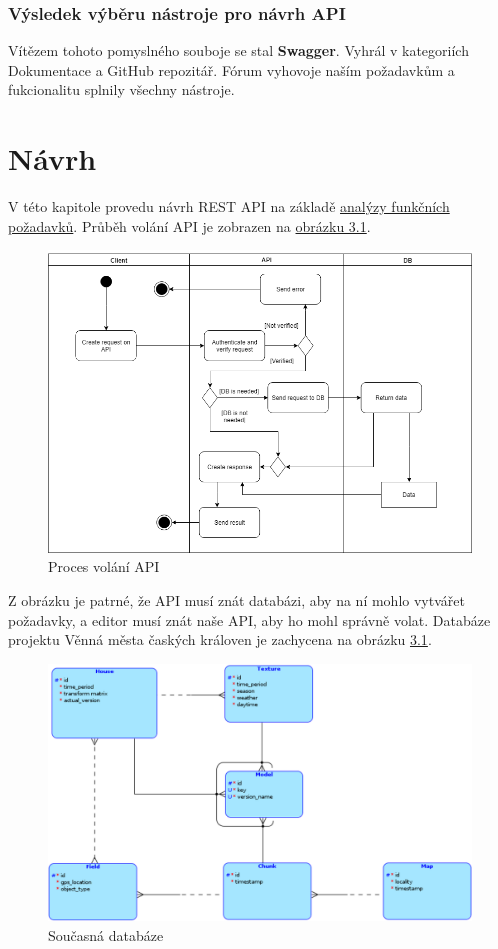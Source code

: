 \documentclass[thesis=B,czech]{FITthesis}[2012/06/26]
\begin{document}
        \subsection{Výsledek výběru nástroje pro návrh API}
            Vítězem tohoto pomyslného souboje se stal \textbf{Swagger}. Vyhrál v kategoriích Dokumentace a GitHub repozitář. Fórum vyhovoje naším požadavkům a fukcionalitu splnily všechny nástroje.
\chapter{Návrh}
    V této kapitole provedu návrh REST API na základě \hyperref[sec:analFP]{analýzy funkčních požadavků}. Průběh volání API je zobrazen na \hyperref[fig:volaniAPI]{obrázku 3.1}.
    \begin{figure}[h!] \label{volaniAPI}
        \includegraphics[width=\linewidth]{API_call}
        \caption{Proces volání API}
    \end{figure}
    
    Z obrázku je patrné, že API musí znát databázi, aby na ní mohlo vytvářet požadavky, a editor musí znát naše API, aby ho mohl správně volat. Databáze projektu Věnná města čaských královen je zachycena na obrázku \hyperref[fig:volaniAPI]{3.1}.

    \begin{figure}[h!] \label{soucasnaDB}
        \includegraphics[width=\linewidth]{contemporary_database}
        \caption{Současná databáze}
    \end{figure}
\end{document}
